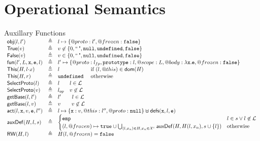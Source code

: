 \documentclass[a4paper]{article}
\begin{document}
\section{Operational Semantics}
\newcommand{\auxf}[2]{#1 & \triangleq & #2}
\begin{display}{Auxillary Functions}
  $\begin{array}{lcl}
  \auxf{\obj(l,l')}{l \pointsto \{@proto: l', @frozen: \false\}}\\
  \auxf{\istrue(v)}{v\not\in\{0,\emptystr,\nil,\und,\false\}}\\
  \auxf{\isfalse(v)}{v\in   \{0,\emptystr,\nil,\und,\false\}}\\
  \auxf{\fun(l',L,\js x,\js e,l)}{l'\mapsto\{@proto: \lfp, \js{prototype}:
        l, @scope: L, @body: \lambda \js{x.e}, @frozen: \false\}}\\
  \auxf{\pickThis(H, \fld{l}{x})}{l \phantom{\und} \quad
        \text{if } (l,@this) \in \dom(H)}\\
  \auxf{\pickThis(H, r)}{\und \phantom{l} \quad \text{otherwise}}\\
  \auxf{\objOrGlob(l)}{l\phantom{_{op}} \quad l\in \loc}\\
  \auxf{\objOrGlob(v)}{\lop \quad v\not\in\loc}\\
  \auxf{\getBase(l,l')}{l' \qquad l \in \loc}\\
  \auxf{\getBase(l,v)}{v \qquad v\not\in\loc}\\

  \auxf{\act(l,\js{x},v,\js{e},l'')}{l\pointsto\{\js{x}:
    v,@this: l'',@proto: \nil\}\disju \defs(\js{x},l,\js{e})}\\

  \auxf{\auxDef(H,l,s)}{\begin{cases}
      \emp & l \in s \lor l \not\in \loc\\
      (l,@frozen) \mapsto \true \cup \bigcup_{(l,x_n) \in H, x_n \in \uvars}
      \auxDef(H,H(l,x_n),s \cup\{l\}) & \mbox{otherwise} \\
    \end{cases}}\\
  \auxf{\ReadWrite(H, l)}{H(l, @frozen) = \false} \\
  \end{array}$
\end{display}

\end{document}
